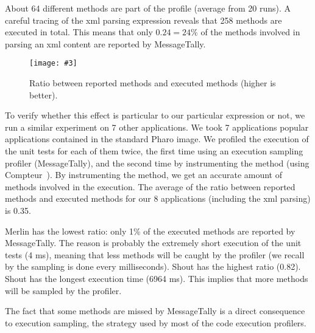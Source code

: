\documentclass{sig-alternate}
\newcommand{\fig}[4]{
	\begin{figure}[#1]
		\centering
		\texttt{[image: \#3]}
		\caption{\label{fig:#3}#4}
	\end{figure}}
\begin{document}
About 64 different methods are part of the profile (average from 20 runs). A careful tracing of the xml parsing expression reveals that 258 methods are executed in total. This means that only $0.24 = 24\%$ of the methods involved in parsing an xml content are reported by MessageTally. 

		

\fig{h}{0.5}{Ratio}{Ratio between reported methods and executed methods (higher is better).}

To verify whether this effect is particular to our particular expression or not, we run a similar experiment on 7 other applications.
We took 7 applications popular applications contained in the standard Pharo image. We profiled the execution of the unit tests for each of them twice, the first time using an execution sampling profiler (MessageTally), and the second time by instrumenting the method (using Compteur~\cite{Berg11d}).
By instrumenting the method, we get an accurate amount of methods involved in the execution. The average of the ratio between reported methods and executed methods for our 8 applications (including the xml parsing) is 0.35. 

Merlin has the lowest ratio: only 1\% of the executed methods are reported by MessageTally. The reason is probably the extremely short execution of the unit tests (4 ms), meaning that less methods will be caught by the profiler (we recall by the sampling is done every milliseconds). 
Shout has the highest ratio (0.82). Shout has the longest execution time (6964 ms). This implies that more methods will be sampled by the profiler. 

The fact that some methods are missed by MessageTally is a direct consequence to execution sampling, the strategy used by most of the code execution profilers.
\end{document}
